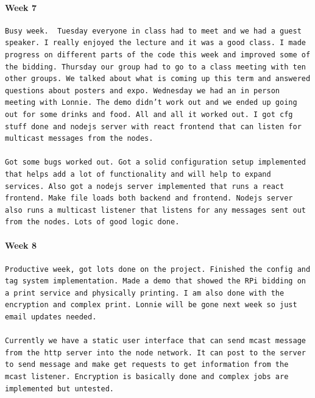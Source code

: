 \documentclass[draftclsnofoot, onecolumn, compsoc, 10pt]{IEEEtran}
\begin{document}
\paragraph{Week 7}
\begin{lstlisting}
Busy week.  Tuesday everyone in class had to meet and we had a guest speaker. I really enjoyed the lecture and it was a good class. I made progress on different parts of the code this week and improved some of the bidding. Thursday our group had to go to a class meeting with ten other groups. We talked about what is coming up this term and answered questions about posters and expo. Wednesday we had an in person meeting with Lonnie. The demo didn’t work out and we ended up going out for some drinks and food. All and all it worked out. I got cfg stuff done and nodejs server with react frontend that can listen for multicast messages from the nodes. 

Got some bugs worked out. Got a solid configuration setup implemented that helps add a lot of functionality and will help to expand services. Also got a nodejs server implemented that runs a react frontend. Make file loads both backend and frontend. Nodejs server also runs a multicast listener that listens for any messages sent out from the nodes. Lots of good logic done. 
\end{lstlisting}
\paragraph{Week 8}
\begin{lstlisting}
Productive week, got lots done on the project. Finished the config and tag system implementation. Made a demo that showed the RPi bidding on a print service and physically printing. I am also done with the encryption and complex print. Lonnie will be gone next week so just email updates needed.  

Currently we have a static user interface that can send mcast message from the http server into the node network. It can post to the server to send message and make get requests to get information from the mcast listener. Encryption is basically done and complex jobs are implemented but untested.
\end{lstlisting}
\end{document}
